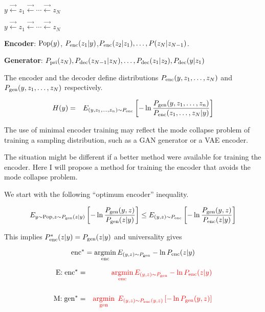 {\vfill
\centerline{$y \stackrel{\rightarrow}{\leftarrow} z_1  \stackrel{\rightarrow}{\leftarrow} \cdots \stackrel{\rightarrow}{\leftarrow} z_N$}

\centerline{$y \stackrel{\rightarrow}{\leftarrow} z_1  \stackrel{\rightarrow}{\leftarrow} \cdots \stackrel{\rightarrow}{\leftarrow} z_N$}

\vfill
{\bf Encoder}: $\mathrm{Pop}(y)$, $P_{\mathrm{enc}}(z_1|y)$,$P_{\mathrm{enc}}(z_2|z_1),\ldots,P(z_N|z_{N-1})$.


\vfill
{\bf Generator}: $P_{\mathrm{pri}}(z_N),P_{\mathrm{dec}}(z_{N-1}|z_N),\ldots,P_{\mathrm{dec}}(z_1|z_2),P_{\mathrm{dec}}(y|z_1)$

\vfill
The encoder and the decoder define distributions
$P_{\mathrm{enc}}(y,z_1,\ldots,z_N)$ and $P_{\mathrm{gen}}(y,z_1,\ldots,z_N)$ respectively.


\begin{eqnarray*}
H(y) & = & E_{(y,z_1,\ldots,z_n) \sim
P_{\mathrm{enc}}}\left[- \ln\frac{P_{\mathrm{gen}}(y,z_1,\ldots,z_n)}{P_{\mathrm{enc}}(z_1,\ldots,z_N|y)}\right]\\
\end{eqnarray*}


The use of minimal encoder training may reflect the mode collapse problem of training a sampling distribution, such as a GAN generator or a VAE encoder.

\vfill
The situation might be different if a better method were available for training the encoder.
Here I will propose a method for training the encoder that avoids the mode collapse problem.

We start with the following ``optimum encoder'' inequality.

\vfill
{\color{red}
$$E_{y \sim \mathrm{Pop},z \sim P_{\mathrm{gen}}(z|y)}\left[ - \ln \frac{P_{\mathrm{gen}}(y,z)}{P_{\mathrm{gen}}(z|y)}\right] \leq E_{(y,z) \sim P_{\mathrm{enc}}}\left[ - \ln \frac{P_{\mathrm{gen}}(y,z)}{P_{\mathrm{enc}}(z|y)}\right]$$
}

\vfill
This implies $P_{\mathrm{enc}}^*(z|y) = P_{\mathrm{gen}}(z|y)$ and universality gives


{\color{red} $$\mathrm{enc}^* = \operatorname*{argmin}_{\mathrm{enc}} E_{(y,z) \sim P_{\mathrm{gen}}} -\ln P_{\mathrm{enc}}(z|y)$$}


\begin{eqnarray*}
\mbox{E:}\;\mathrm{enc}^* & = & {\color{red} \operatorname*{argmin}_{\mathrm{enc}} E_{(y,z) \sim P_{\mathrm{gen}}} -\ln P_{\mathrm{enc}}(z|y)} \\
\\
\mbox{M:}\;\mathrm{gen}^* & =& {\color{red} \operatorname*{argmin}_{\mathrm{gen}}\;E_{(y,z) \sim P_{\mathrm{enc}}(y,z)}\left[-\ln P_{\mathrm{gen}}(y,z)\right]}
\end{eqnarray*}

}
